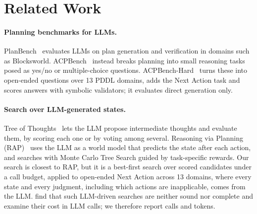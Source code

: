 \section{Related Work}
\label{sec:related}

\paragraph{Planning benchmarks for LLMs.}
PlanBench~\citep{valmeekam2023planbench} evaluates LLMs on plan generation and verification in domains such as Blocksworld.
ACPBench~\citep{kokel2025acpbench} instead breaks planning into small reasoning tasks posed as
yes/no or multiple-choice questions. ACPBench-Hard~\citep{kokel2025acpbenchhard} turns these into
open-ended questions over 13 PDDL domains, adds the Next Action task and scores answers with
symbolic validators; it evaluates direct generation only.

\paragraph{Search over LLM-generated states.}
Tree of Thoughts~\citep{yao2023tot} lets the LLM propose intermediate thoughts and evaluate them,
by scoring each one or by voting among several. Reasoning via Planning (RAP)~\citep{hao2023rap} uses the LLM as a world model that
predicts the state after each action, and searches with Monte Carlo Tree Search guided by task-specific rewards. Our search is closest to RAP, but it is a
best-first search over scored candidates under a call budget, applied to open-ended Next Action
across 13 domains, where every state and every judgment, including which actions are inapplicable,
comes from the LLM. \citet{katz2024tos} find that such LLM-driven searches are neither sound nor
complete and examine their cost in LLM calls; we therefore report calls and tokens.

